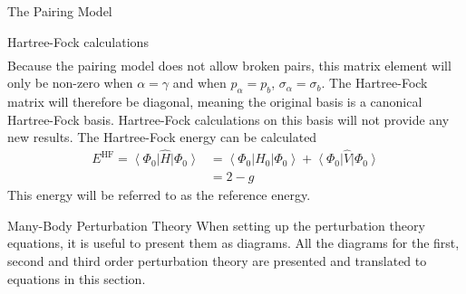 \documentclass[twoside,english]{uiofysmaster}
\begin{document}
\begin{chapter}{The Pairing Model}
\begin{section}{Hartree-Fock calculations}
\begin{align}
 		\end{align}
 		Because the pairing model does not allow broken pairs, this matrix element will only be non-zero when $\alpha = \gamma$ and when $p_{\alpha} = p_{b}$, $\sigma_ \alpha = \sigma_b$. The Hartree-Fock matrix will therefore be diagonal, meaning the original basis is a canonical Hartree-Fock basis. Hartree-Fock calculations on this basis will not provide any new results. The Hartree-Fock energy can be calculated
 		\begin{align}
 			E^{\text{HF}} = \left< \Phi_0 \right| \hat H \left| \Phi_0 \right> &= \left< \Phi_0 \right| \hat H_0 \left| \Phi_0 \right> + \left< \Phi_0 \right| \hat V \left| \Phi_0 \right> \\
 			&= 2 - g 
 		\end{align}
 		This energy will be referred to as the reference energy. 
 	\end{section}

	\begin{section}{Many-Body Perturbation Theory}
 		When setting up the perturbation theory equations, it is useful to present them as diagrams. All the diagrams for the first, second and third order perturbation theory are presented and translated to equations in this section. 
 		

\end{section}
\end{chapter}
\end{document}
